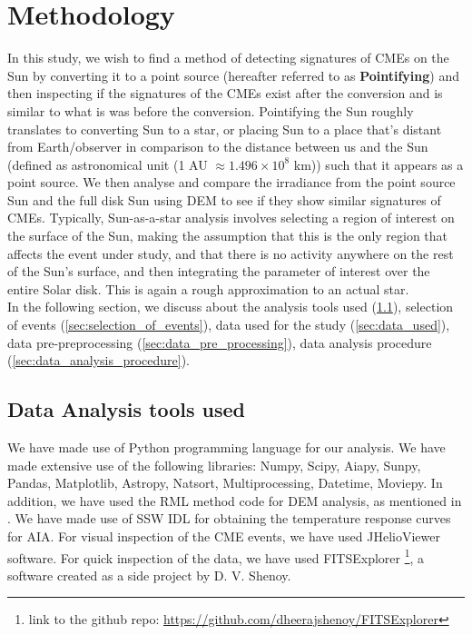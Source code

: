 \section{Methodology}

In this study, we wish to find a method of detecting signatures of CMEs on the Sun by converting it to a point source (hereafter referred to as \textbf{Pointifying}) and then inspecting if the signatures of the CMEs exist after the conversion and is similar to what is was before the conversion. Pointifying the Sun roughly translates to converting Sun to a star, or placing Sun to a place that's distant from Earth/observer in comparison to the distance between us and the Sun (defined as astronomical unit (1 AU $\approx 1.496\times10^{8}$ km)) such that it appears as a point source. We then analyse and compare the irradiance from the point source Sun and the full disk Sun using DEM to see if they show similar signatures of CMEs. Typically, Sun-as-a-star analysis involves selecting a region of interest on the surface of the Sun, making the assumption that this is the only region that affects the event under study, and that there is no activity anywhere on the rest of the Sun's surface, and then integrating the parameter of interest over the entire Solar disk. This is again a rough approximation to an actual star.\\

In the following section, we discuss about the analysis tools used (\cref{sec:data_analysis_tools_used}), selection of events (\cref{sec:selection_of_events}), data used for the study (\cref{sec:data_used}), data pre-preprocessing (\cref{sec:data_pre_processing}), data analysis procedure (\cref{sec:data_analysis_procedure}).

  \subsection{Data Analysis tools used}
  \label{sec:data_analysis_tools_used}

We have made use of Python programming language for our analysis. We have made extensive use of the following libraries: Numpy, Scipy, Aiapy, Sunpy, Pandas, Matplotlib, Astropy, Natsort, Multiprocessing, Datetime, Moviepy. In addition, we have used the RML method code for DEM analysis, as mentioned in \citep{Massa2023}. We have made use of SSW IDL for obtaining the temperature response curves for AIA. For visual inspection of the CME events, we have used JHelioViewer software. For quick inspection of the data, we have used FITSExplorer \footnote{link to the github repo: \url{https://github.com/dheerajshenoy/FITSExplorer}}, a software created as a side project by D. V. Shenoy.


